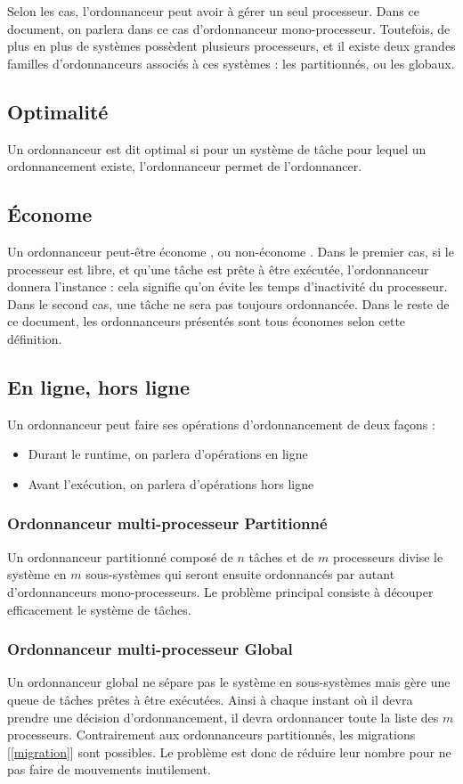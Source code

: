 \documentclass[11pt,a4paper,oneside]{report}
\begin{document}
	Selon les cas, l'ordonnanceur peut avoir à gérer un seul processeur. Dans ce 
	document, on parlera dans ce cas d'ordonnanceur mono-processeur. Toutefois, de plus en 
	plus de systèmes possèdent plusieurs processeurs, et il existe deux grandes familles 
	d'ordonnanceurs associés à ces systèmes : les partitionnés, ou les globaux. \medskip
	
	\subsection{Optimalité}\label{optimal}
	Un ordonnanceur est dit optimal si pour un système de tâche pour lequel un ordonnancement 
	existe, l'ordonnanceur permet de l'ordonnancer.
	
	\subsection{Économe} 
	Un ordonnanceur peut-être \og économe\fg{} , ou \og non-économe\fg{} . Dans le premier cas, si le processeur est libre, 
	et qu'une tâche est prête à être exécutée, l'ordonnanceur donnera l'instance : cela signifie 
	qu'on évite les temps d'inactivité du processeur. Dans le second cas, une tâche ne sera pas toujours ordonnancée.
	Dans le reste de ce document, les ordonnanceurs présentés sont tous économes selon cette définition.
	
	\subsection{En ligne, hors ligne}
	Un ordonnanceur peut faire ses opérations d'ordonnancement de deux façons : \medskip
	\begin{itemize}
		\item Durant le runtime, on parlera d'opérations en ligne
		\item Avant l'exécution, on parlera d'opérations hors ligne
	\end{itemize}	
	
	\subsubsection{Ordonnanceur multi-processeur Partitionné}
	Un ordonnanceur partitionné composé de $n$ tâches et de $m$ processeurs divise 
	le système en $m$ sous-systèmes qui seront ensuite ordonnancés par autant d'ordonnanceurs 
	mono-processeurs. Le problème principal consiste à découper efficacement le système de tâches.
	
	\subsubsection{Ordonnanceur multi-processeur Global}
	Un ordonnanceur global ne sépare pas le système en sous-systèmes mais gère une 
	queue de tâches prêtes à être exécutées. Ainsi à chaque instant où il devra prendre une décision 
	d'ordonnancement, il devra ordonnancer toute la liste des $m$ processeurs.\medskip
	Contrairement aux ordonnanceurs partitionnés, les migrations [\ref{migration}] sont possibles. Le problème 
	est donc de réduire leur nombre pour ne pas faire de mouvements inutilement.
	
\end{document}
